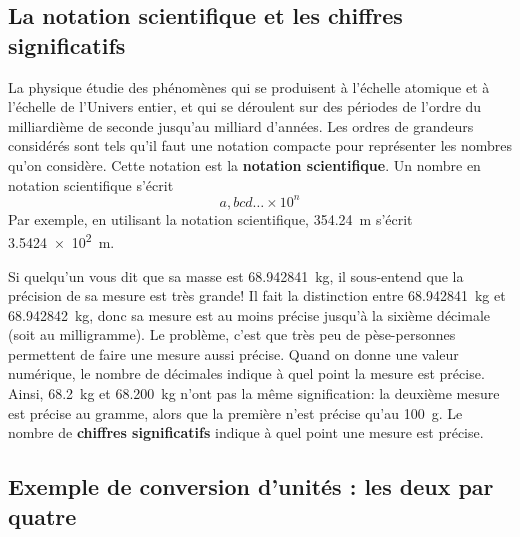 \subsection{La notation scientifique et les chiffres significatifs}

La physique étudie des phénomènes qui se produisent à l'échelle atomique et à
l'échelle de l'Univers entier, et qui se déroulent sur des périodes de l'ordre
du milliardième de seconde jusqu'au milliard d'années.  Les ordres de grandeurs
considérés sont tels qu'il faut une notation compacte pour représenter les
nombres qu'on considère.  Cette notation est la \textbf{notation scientifique}.
Un nombre en notation scientifique s'écrit
\begin{equation*}
  a,bcd\ldots \times 10^n
\end{equation*}
Par exemple, en utilisant la notation scientifique, \SI{354.24}{\meter} s'écrit
\SI{3.5424e2}{\meter}.

Si quelqu'un vous dit que sa masse est \SI{68.942841}{\kilogram}, il
sous-entend que la précision de sa mesure est très grande!  Il fait la
distinction entre \SI{68.942841}{\kilogram} et \SI{68.942842}{\kilogram}, donc
sa mesure est au moins précise jusqu'à la sixième décimale (soit au
milligramme).  Le problème, c'est que très peu de pèse-personnes permettent de
faire une mesure aussi précise.  
Quand on donne une valeur numérique, le nombre
de décimales indique à quel point la mesure est précise.  Ainsi,
\SI{68.2}{\kilogram} et \SI{68.200}{\kilogram} n'ont pas la même signification:
la deuxième mesure est précise au gramme, alors que la première n'est précise
qu'au \SI{100}{\gram}.  Le nombre de \textbf{chiffres significatifs} indique à
quel point une mesure est précise.


\subsection{Exemple de conversion d'unités : les deux par quatre}

